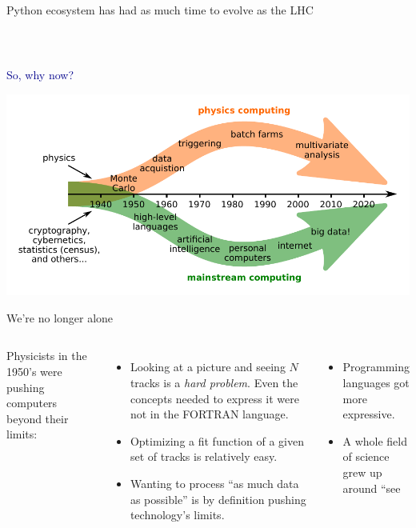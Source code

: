 \documentclass[aspectratio=169]{beamer}
\begin{document}
\begin{frame}{Python ecosystem has had as much time to evolve as the LHC}
\vspace{0.18 cm}
\begin{columns}
\end{columns}
\end{frame}

\begin{frame}{\mbox{ }}
\vspace{0.5 cm}
\huge
\begin{center}
\textcolor{darkblue}{So, why now?}

\vspace{0.5 cm}
\includegraphics[width=0.75\linewidth]{PLOTS/grand-timeline.pdf}
\end{center}
\end{frame}

\begin{frame}{We're no longer alone}
\large
\vspace{0.5 cm}
\begin{columns}[t]
Physicists in the 1950's were pushing computers beyond their limits:

\vspace{0.25 cm}
\begin{itemize}\setlength{\itemsep}{0.25 cm}
\item<2-> Looking at a picture and seeing $N$ tracks is a {\it hard problem}. Even the concepts needed to express it were not in the FORTRAN language.

\item<3-> Optimizing a fit function of a given set of tracks is relatively easy.

\item<4-> Wanting to process ``as much data as possible'' is by definition pushing technology's limits.
\end{itemize}


\vspace{0.25 cm}
\begin{itemize}\setlength{\itemsep}{0.25 cm}
\item<6-> Programming languages got more expressive.

\item<7-> A whole field of science grew up around ``see
\end{itemize}
\end{columns}
\end{frame}
\end{document}
